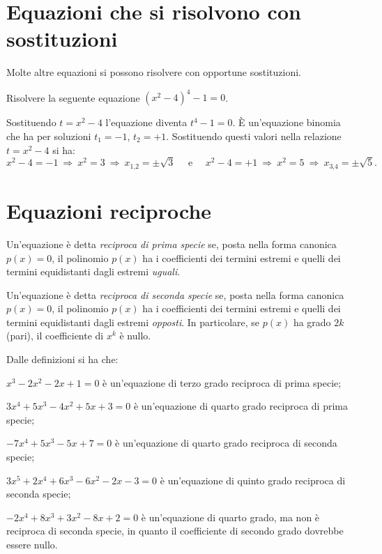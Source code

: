 \section{Equazioni che si risolvono con sostituzioni}

Molte altre equazioni si possono risolvere con opportune sostituzioni.
\begin{exrig}
\begin{esempio}
Risolvere la seguente equazione $ \left(x^2-4\right)^4-1=0 $.

Sostituendo $t=x^2-4$ l'equazione diventa $t^4-1=0$. È un'equazione binomia che ha per soluzioni $t_1=-1$, $t_2=+1$. Sostituendo questi valori nella relazione $t=x^2-4$ si ha: 
\[x^2-4=-1\:\Rightarrow\: x^2=3\:\Rightarrow\: x_{1\text{,}2}=\pm \sqrt 3\quad\text{ e }\quad x^2-4=+1\:\Rightarrow\: x^2=5\:\Rightarrow\: x_{3\text{,}4}=\pm \sqrt 5.\]
\end{esempio}
\end{exrig}
\ovalbox{\risolvii \ref{ese:5.34}, \ref{ese:5.35}, \ref{ese:5.36}, \ref{ese:5.37}}

\section{Equazioni reciproche}

\begin{definizione}
Un'equazione è detta \emph{reciproca di prima specie} se, posta nella forma canonica $p(x)=0$, il polinomio $p(x)$ ha i coefficienti dei termini estremi e quelli dei termini equidistanti dagli estremi \emph{uguali}.
\end{definizione}

\begin{definizione}
Un'equazione è detta \emph{reciproca di seconda specie} se, posta nella forma canonica $p(x)=0$, il polinomio $p(x)$ ha i coefficienti dei termini estremi e quelli dei termini equidistanti dagli estremi \emph{opposti}. In particolare, se $p(x)$ ha grado $2k$ (pari), il coefficiente di $x^k$ è nullo.
\end{definizione}

Dalle definizioni si ha che:

\begin{itemize*}
\item $x^3-2x^2-2x+1=0$ è un'equazione di terzo grado reciproca di prima specie;
\item $3x^4+5x^3-4x^2+5x+3=0$ è un'equazione di quarto grado reciproca di prima specie;
\item $-7x^4+5x^3-5x+7=0$ è un'equazione di quarto grado reciproca di seconda specie;
\item $3x^5+2x^4+6x^3-6x^2-2x-3=0$ è un'equazione di quinto grado reciproca di seconda specie;
\item $-2x^4+8x^3+3x^2-8x+2=0$ è un'equazione di quarto grado, ma non è reciproca di seconda specie, in quanto il coefficiente di secondo grado dovrebbe essere nullo.
\end{itemize*}

